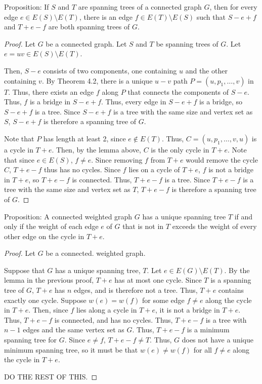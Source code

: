 \documentclass[12pt]{article}
\begin{document}
Proposition: If $S$ and $T$ are spanning trees of a connected graph $G$, then for every edge $e \in E(S) \setminus E(T)$, there is an edge $f \in E(T) \setminus E(S)$ such that $S-e+f$ and $T+e-f$ are both spanning trees of $G$.
\begin{proof}
    Let $G$ be a connected graph.
    Let $S$ and $T$ be spanning trees of $G$.
    Let $e=uv \in E(S) \setminus E(T)$.

    Then, $S - e$ consists of two components, one containing $u$ and the other containing $v$.
    By Theorem 4.2, there is a unique $u-v$ path $P = (u, p_1, \hdots, v)$ in $T$.
    Thus, there exists an edge $f$ along $P$ that connects the components of $S - e$.
    Thus, $f$ is a bridge in $S - e + f$.
    Thus, every edge in $S-e+f$ is a bridge, so $S-e+f$ is a tree.
    Since $S-e+f$ is a tree with the same size and vertex set as $S$, $S-e+f$ is therefore a spanning tree of $G$.

    Note that $P$ has length at least 2, since $e \notin E(T)$.
    Thus, $C = (u, p_1, \hdots, v, u)$ is a cycle in $T+e$.
    Then, by the lemma above, $C$ is the only cycle in $T+e$.
    Note that since $e \in E(S)$, $f \neq e$.
    Since removing $f$ from $T+e$ would remove the cycle $C$, $T+e-f$ thus has no cycles.
    Since $f$ lies on a cycle of $T+e$, $f$ is not a bridge in $T+e$, so $T+e-f$ is connected.
    Thus, $T+e-f$ is a tree.
    Since $T+e-f$ is a tree with the same size and vertex set as $T$, $T+e-f$ is therefore a spanning tree of $G$.
\end{proof}

\newpage{} Proposition: A connected weighted graph $G$ has a unique spanning tree $T$ if and only if the weight of each edge $e$ of $G$ that is not in $T$ exceeds the weight of every other edge on the cycle in $T+e$.
\begin{proof}
    Let $G$ be a connected. weighted graph.

    Suppose that $G$ has a unique spanning tree, $T$.
    Let $e \in E(G) \setminus E(T)$.
    By the lemma in the previous proof, $T+e$ has at most one cycle.
    Since $T$ is a spanning tree of $G$, $T+e$ has $n$ edges, and is therefore not a tree.
    Thus, $T+e$ contains exactly one cycle.
    Suppose $w(e) = w(f)$ for some edge $f \neq e$ along the cycle in $T+e$.
    Then, since $f$ lies along a cycle in $T+e$, it is not a bridge in $T+e$.
    Thus, $T+e-f$ is connected, and has no cycles.
    Thus, $T+e-f$ is a tree with $n-1$ edges and the same vertex set as $G$.
    Thus, $T+e-f$ is a minimum spanning tree for $G$.
    Since $e \neq f$, $T+e-f \neq T$.
    Thus, $G$ does not have a unique minimum spanning tree, so it must be that $w(e) \neq w(f)$ for all $f \neq e$ along the cycle in $T+e$.

    DO THE REST OF THIS.
\end{proof}
\end{document}
